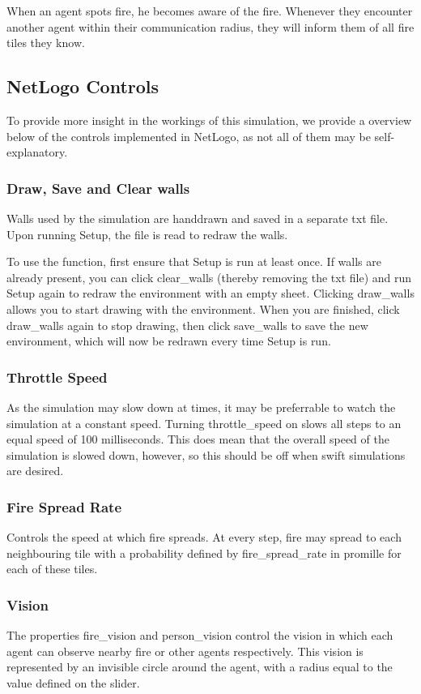 \documentclass[a4paper]{article}
\begin{document}
When an agent spots fire, he becomes aware of the fire. Whenever they encounter another agent within their communication radius, they will inform them of all fire tiles they know.

\subsection{NetLogo Controls}
To provide more insight in the workings of this simulation, we provide a overview below of the controls implemented in NetLogo, as not all of them may be self-explanatory.

\subsubsection{Draw, Save and Clear walls}
Walls used by the simulation are handdrawn and saved in a separate txt file. Upon running Setup, the file is read to redraw the walls.

To use the function, first ensure that Setup is run at least once. If walls are already present, you can click clear\_walls (thereby removing the txt file) and run Setup again to redraw the environment with an empty sheet. Clicking draw\_walls allows you to start drawing with the environment. When you are finished, click draw\_walls again to stop drawing, then click save\_walls to save the new environment, which will now be redrawn every time Setup is run.

\subsubsection{Throttle Speed}
As the simulation may slow down at times, it may be preferrable to watch the simulation at a constant speed. Turning throttle\_speed on slows all steps to an equal speed of 100 milliseconds. This does mean that the overall speed of the simulation is slowed down, however, so this should be off when swift simulations are desired.

\subsubsection{Fire Spread Rate}
Controls the speed at which fire spreads. At every step, fire may spread to each neighbouring tile with a probability defined by fire\_spread\_rate in promille for each of these tiles.

\subsubsection{Vision}
The properties fire\_vision and person\_vision control the vision in which each agent can observe nearby fire or other agents respectively. This vision is represented by an invisible circle around the agent, with a radius equal to the value defined on the slider.
\end{document}
